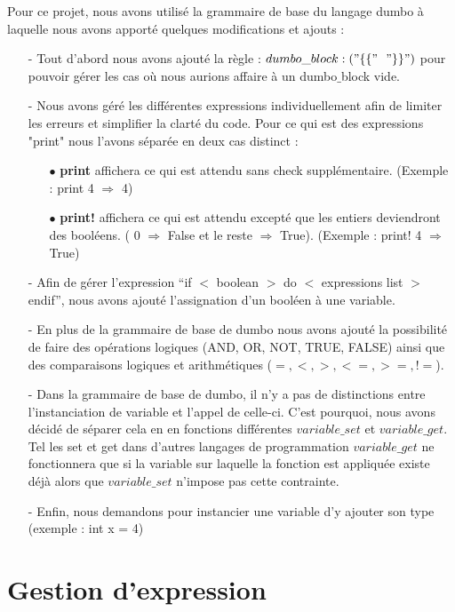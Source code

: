\documentclass[a4paper, 12pt]{article}
\begin{document}
Pour ce projet, nous avons utilisé la grammaire de base du langage dumbo à laquelle nous avons apporté quelques modifications et ajouts : \begin{itemize}
	\item[-] Tout d'abord nous avons ajouté la règle : $dumbo\_block: ( "\{\{"\ \ "\}\}" )$ pour pouvoir gérer les cas où nous aurions affaire à un dumbo$\_$block vide.
	\item[-] Nous avons géré les différentes expressions individuellement afin de limiter les erreurs et simplifier la clarté du code. Pour ce qui est des expressions "print" nous l'avons séparée en deux cas distinct :\begin{itemize}
		\item[$\bullet$] \textbf{print} affichera ce qui est attendu sans check supplémentaire. (Exemple : print 4 $\Rightarrow$ 4)
		\item[$\bullet$] \textbf{print!} affichera ce qui est attendu excepté que les entiers deviendront des booléens. ( 0 $\Rightarrow$ False et le reste $\Rightarrow$ True). (Exemple : print! 4 $\Rightarrow$ True)	
	\end{itemize}
	\item[-] Afin de gérer l'expression “if $<$ boolean $>$ do $<$ expressions list $>$ endif”, nous avons ajouté l'assignation d'un booléen à une variable.
	\item[-] En plus de la grammaire de base de dumbo nous avons ajouté la possibilité de faire des opérations logiques (AND, OR, NOT, TRUE, FALSE) ainsi que des comparaisons logiques et arithmétiques ($ =, <, >, <=, >=, !=$).
	\item[-] Dans la grammaire de base de dumbo, il n'y a pas de distinctions entre l'instanciation de variable et l'appel de celle-ci. C'est pourquoi, nous avons décidé de séparer cela en en fonctions différentes $\textit{variable\_set}$ et $\textit{variable\_get}$. Tel les set et get dans d'autres langages de programmation $\textit{variable\_get}$ ne fonctionnera que si la variable sur laquelle la fonction est appliquée existe déjà alors que $\textit{variable\_set}$ n'impose pas cette contrainte.
	\item[-] Enfin, nous demandons pour instancier une variable d'y ajouter son type (exemple : int x = 4)
\end{itemize}

\section{Gestion d'expression}
\end{document}
